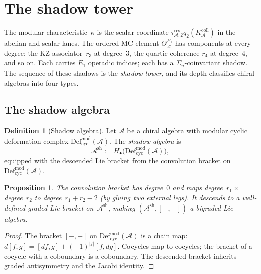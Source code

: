 \documentclass[11pt,reqno]{amsart}
\newtheorem{proposition}[theorem]{Proposition}
\theoremstyle{definition}
\newtheorem{definition}[theorem]{Definition}
\theoremstyle{remark}
\newcommand{\cA}{\mathcal{A}}
\newcommand{\Eone}{E_1}
\newcommand{\Ash}{\cA^{\mathrm{sh}}}
\newcommand{\Defcyc}{\mathrm{Def}_{\mathrm{cyc}}}
\numberwithin{equation}{section}
\begin{document}
\section{The shadow tower}\label{sec:shadow}

The modular characteristic~$\kappa$ is the scalar coordinate
$\tau_{\cA,2}^{\mathrm{res}}q_2(K_\cA^{\mathrm{coll}})$ in the abelian
and scalar lanes.  The ordered MC element
$\Theta^{\Eone}_\cA$ has components at every degree:
the KZ associator~$r_3$ at degree~$3$, the quartic coherence
$r_4$ at degree~$4$, and so on. Each carries $\Eone$ operadic
indices; each has a $\Sigma_n$-coinvariant shadow. The
sequence of these shadows is the \emph{shadow tower}, and
its depth classifies chiral algebras into four types.

\subsection{The shadow algebra}

\begin{definition}[Shadow algebra]\label{def:shadow-algebra}
Let $\cA$ be a chiral algebra with modular cyclic deformation
complex $\Defcyc^{\mathrm{mod}}(\cA)$. The \emph{shadow
algebra} is
\begin{equation}\label{eq:shadow-algebra}
\Ash := H_\bullet\bigl(\Defcyc^{\mathrm{mod}}(\cA)\bigr),
\end{equation}
equipped with the descended Lie bracket from the convolution
bracket on $\Defcyc^{\mathrm{mod}}(\cA)$.
\end{definition}

\begin{proposition}\label{prop:shadow-bracket}
The convolution bracket has degree~$0$ and maps
degree~$r_1 \times$ degree~$r_2$ to degree~$r_1 + r_2 - 2$
\textup{(}by gluing two external legs\textup{)}. It descends
to a well-defined graded Lie bracket on~$\Ash$, making
$(\Ash, [-,-])$ a bigraded Lie algebra.
\end{proposition}

\begin{proof}
The bracket $[-,-]$ on $\Defcyc^{\mathrm{mod}}(\cA)$ is a
chain map: $d[f,g] = [df,g] + (-1)^{|f|}[f,dg]$. Cocycles
map to cocycles; the bracket of a cocycle with a coboundary is
a coboundary. The descended bracket inherits graded
antisymmetry and the Jacobi identity.
\end{proof}
\end{document}
